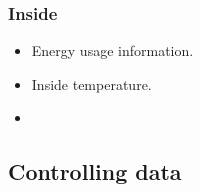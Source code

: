 \subsubsection{Inside}
\begin{itemize}
    \item Energy usage information.
    \item Inside temperature.
    \item 
\end{itemize}

\subsection{Controlling data}
\label{ss:controlling_data_research}
